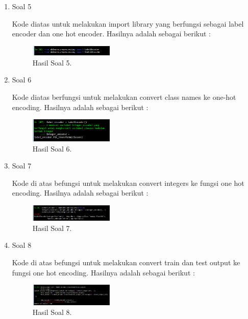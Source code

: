 \begin{enumerate}
	\item Soal 5
	\hfill\break
	
	Kode diatas untuk melakukan import library yang berfungsi sebagai label encoder dan one hot encoder. Hasilnya adalah sebagai berikut :
	\begin{figure}[H]
	\centering
		\includegraphics[width=4cm]{figures/1174070/7/materi/hasil5.PNG}
		\caption{Hasil Soal 5.}
	\end{figure}

	\item Soal 6
	\hfill\break
	
	Kode diatas berfungsi untuk melakukan convert class names ke one-hot encoding. Hasilnya adalah sebagai berikut :
	\begin{figure}[H]
	\centering
		\includegraphics[width=4cm]{figures/1174070/7/materi/hasil6.PNG}
		\caption{Hasil Soal 6.}
	\end{figure}

	\item Soal 7
	\hfill\break
	
	Kode di atas befungsi untuk melakukan convert integers ke fungsi one hot encoding. Hasilnya adalah sebagai berikut :
	\begin{figure}[H]
	\centering
		\includegraphics[width=4cm]{figures/1174070/7/materi/hasil7.PNG}
		\caption{Hasil Soal 7.}
	\end{figure}

	\item Soal 8
	\hfill\break
	
	Kode di atas befungsi untuk melakukan convert train dan test output ke fungsi one hot encoding. Hasilnya adalah sebagai berikut :
	\begin{figure}[H]
	\centering
		\includegraphics[width=4cm]{figures/1174070/7/materi/hasil8.PNG}
		\caption{Hasil Soal 8.}
	\end{figure}


\end{enumerate}
